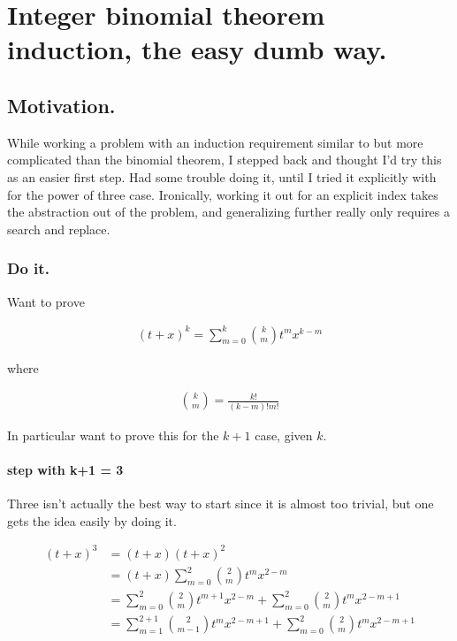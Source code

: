 \chapter{Integer binomial theorem induction, the easy dumb way.}
\label{chap:binomial}
\date{ March 26, 2009.  $RCSfile: binomial.tex,v $ Last $Revision: 1.10 $ $Date: 2009/08/20 02:24:45 $}

\section{Motivation.}

While working a problem with an induction requirement similar to but more 
complicated than the binomial theorem, I stepped back and thought I'd try
this as an easier first step.  Had some trouble doing it, until I tried it
explicitly with for the power of three case.  Ironically, working it
out for an explicit index takes the abstraction out of the problem, and
generalizing further really only requires a search and replace.

\subsection{Do it.}

Want to prove

\begin{align}
(t + x)^k = \sum_{m=0}^k \binom{k}{m} t^m x^{k-m}
\end{align}

where

\begin{align}
\binom{k}{m} = \frac{k!}{(k-m)!m!}
\end{align}

In particular want to prove this for the $k+1$ case, given $k$.

\subsubsection{step with k+1 = 3}

Three isn't actually the best way to start since it is almost too trivial, but
one gets the idea easily by doing it.

\begin{align*}
(t + x)^3 
&= (t + x)(t + x)^2  \\
&= (t + x)\sum_{m=0}^2 \binom{2}{m} t^m x^{2-m} \\
&= 
\sum_{m=0}^2 \binom{2}{m} t^{m+1} x^{2-m}
+ \sum_{m=0}^2 \binom{2}{m} t^{m} x^{2-m + 1} \\
&= 
\sum_{m=1}^{2 + 1} \binom{2}{m-1} t^{m} x^{2 - m + 1}
+ \sum_{m=0}^2 \binom{2}{m} t^{m} x^{2-m + 1} \\
\end{align*}

